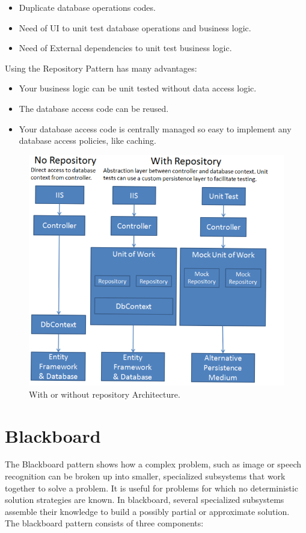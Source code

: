 \documentclass{article}
\begin{document}
\begin{itemize}

\item Duplicate database operations codes.
\item Need of UI to unit test database operations and business logic.
\item Need of External dependencies to unit test business logic.

\end{itemize}

\noindent Using the Repository Pattern has many advantages:
\begin{itemize}

\item Your business logic can be unit tested without data access logic.
\item The database access code can be reused.
\item Your database access code is centrally managed so easy to implement any database access policies, like caching.

\end{itemize}

\begin{figure}[h]
\centering
\includegraphics[scale=0.55]{r.png}
\caption{With or without repository Architecture.}
\label{fig_r}
\end{figure}
	


\section{Blackboard}
The Blackboard pattern shows how a complex problem, such as image or speech recognition can be broken up into smaller, specialized subsystems that work together to solve a problem. It is useful for problems for which no deterministic solution strategies are known. In blackboard, several specialized subsystems assemble their knowledge to build a possibly partial or approximate solution.\\
The blackboard pattern consists of three components:
\end{document}
